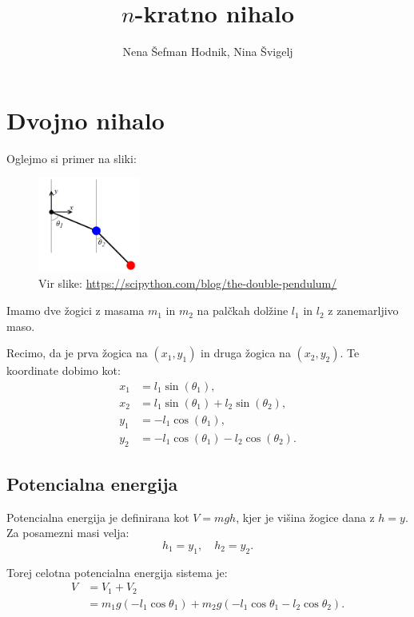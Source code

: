 \documentclass[a4paper,12pt]{article}
\begin{document}
\title{$n$-kratno nihalo}
\author{Nena Šefman Hodnik, Nina Švigelj}
\date{}
\maketitle


\section{Dvojno nihalo}

Oglejmo si primer na sliki:

\begin{figure}[h!]
    \centering
    \includegraphics[width=0.3\textwidth]{primer_dveh_slika.png}
    \caption{Vir slike: \url{https://scipython.com/blog/the-double-pendulum/}}
    \label{fig:dvojno_nihalo}
\end{figure}

Imamo dve žogici z masama $m_1$ in $m_2$ na palčkah dolžine $l_1$ in $l_2$ z zanemarljivo maso.

Recimo, da je prva žogica na $(x_1, y_1)$ in druga žogica na $(x_2, y_2)$. Te koordinate dobimo kot:
\begin{align*}
x_1 &= l_1 \sin(\theta_1), \\
x_2 &= l_1 \sin(\theta_1) + l_2 \sin(\theta_2), \\
y_1 &= -l_1 \cos(\theta_1), \\
y_2 &= -l_1 \cos(\theta_1) - l_2 \cos(\theta_2).
\end{align*}

\subsection*{Potencialna energija}

Potencialna energija je definirana kot $V = m g h$, kjer je višina žogice dana z $h = y$. \\
Za posamezni masi velja: $$h_1 = y_1, \quad h_2 = y_2.$$

Torej celotna potencialna energija sistema je:
\begin{align*}
V &= V_1 + V_2 \\
&= m_1 g(-l_1 \cos\theta_1) + m_2 g(-l_1 \cos\theta_1 - l_2 \cos\theta_2).
\end{align*}
\end{document}
